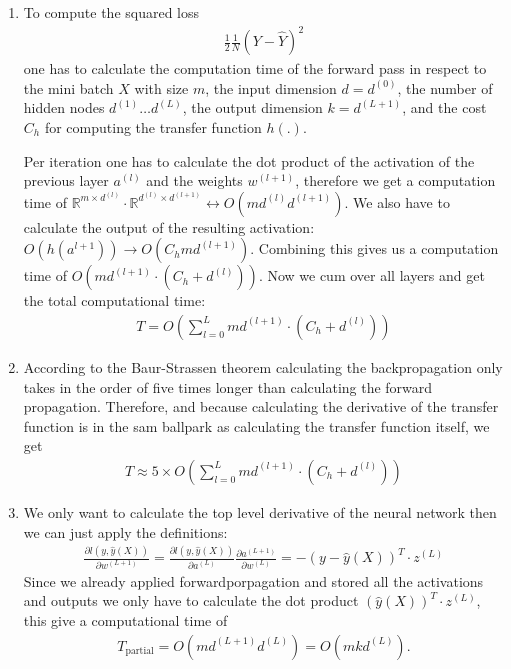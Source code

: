 \documentclass[12pt]{article}
\begin{document}
\begin{enumerate}
	\item To compute the squared loss 
	\begin{align}
		\frac{1}{2}\frac{1}{N}\left( Y - \hat{Y} \right)^2
	\end{align}
	one has to calculate the computation time of the forward pass in respect to the mini batch $X$ with size $m$, the input dimension $d = d^{(0)}$, the number of hidden nodes $d^{(1)}\dots d^{(L)}$, the output dimension $k = d^{(L+1)}$, and the cost $C_h$ for computing the transfer function $h(.)$. \par
	Per iteration one has to calculate the dot product of the activation of the previous layer $a^{(l)}$ and the weights $w^{(l+1)}$, therefore we get a computation time of $ \mathbb{R}^{m\times d^{(l)}} \cdot \mathbb{R}^{d^{(l)}\times d^{(l+1)}} \leftrightarrow O\left( md^{(l)}d^{(l+1)}\right)$. We also have to calculate the output of the resulting activation: $O(h(a^{l+1}))\rightarrow O(C_hmd^{(l+1)})$. Combining this gives us a computation time of $O\left( md^{(l+1)}\cdot(C_h + d^{(l)}) \right)$. Now we cum over all layers and get the total computational time:
	\begin{align}
		T = O
			\left(
				\sum_{l=0}^{L} md^{(l+1)}\cdot(C_h + d^{(l)})
			\right)
	\end{align}
	\item According to the Baur-Strassen theorem calculating the backpropagation only takes in the order of five times longer than calculating the forward propagation. Therefore, and because calculating the derivative of the transfer function is in the sam ballpark as calculating the transfer function itself, we get
	\begin{align}
		T \approx 5\times O
		\left(
		\sum_{l=0}^{L} md^{(l+1)}\cdot(C_h + d^{(l)})
		\right)
	\end{align}
	\item We only want to calculate the top level derivative of the neural network then we can just apply the definitions:
	\begin{align}
		\frac{\partial l(y,\hat{y}(X))}{\partial w^{(L+1)}}= \frac{\partial l(y,\hat{y}(X))}{\partial a^{(L)}}\frac{\partial a^{(L+1)}}{\partial w^{(L)}} = - ( y - \hat{y}(X) )^T\cdot z^{(L)}
	\end{align}
	Since we already applied forwardporpagation and stored all the activations and outputs we only have to calculate the dot product $(\hat{y}(X) )^T\cdot z^{(L)}$, this give a computational time of 
	\begin{align}
		T_{\text{partial}} = O\left( md^{(L+1)}d^{(L)} \right) = O\left( mkd^{(L)} \right). 
	\end{align}
\end{enumerate}
\end{document}
